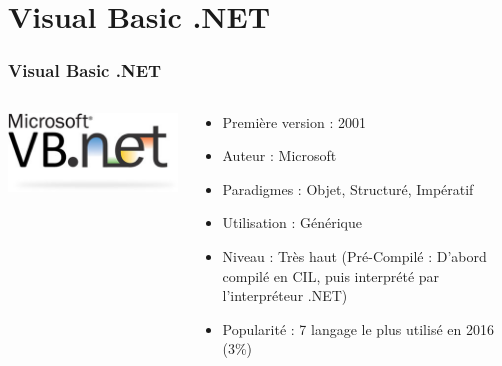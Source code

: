\documentclass{beamer}
\begin{document}
	\section{Visual Basic .NET}	
	\begin{frame}
	\frametitle{Visual Basic .NET}
			\begin{columns}

	\begin{column}{3cm}
			\includegraphics[scale=0.3]{vb_color.jpg}
	\end{column}

	\begin{column}{7cm}
		\begin{itemize}		 	
			\item Première version : 2001
			\item Auteur : Microsoft
			\item Paradigmes : Objet, Structuré, Impératif
			\item Utilisation : Générique
			\item Niveau : Très haut (Pré-Compilé : D'abord compilé en CIL, puis interprété par l'interpréteur .NET)
			\item Popularité : 7 langage le plus utilisé en 2016 (3\%)
		\end{itemize}
	\end{column}
	\end{columns}
	
	\end{frame}
	
\end{document}
